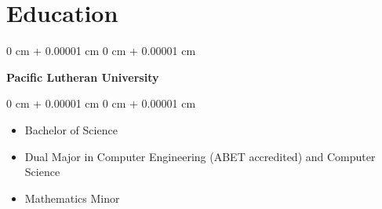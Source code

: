 \documentclass[10pt, letterpaper]{article}
\newenvironment{highlights}{
    \begin{itemize}[
        topsep=0.10 cm,
        parsep=0.10 cm,
        partopsep=0pt,
        itemsep=0pt,
        leftmargin=0 cm + 10pt
    ]
}{
    \end{itemize}
} %
\newenvironment{onecolentry}{
    \begin{adjustwidth}{
        0 cm + 0.00001 cm
    }{
        0 cm + 0.00001 cm
    }
}{
    \end{adjustwidth}
} %
\newenvironment{twocolentry}[2][]{
    \onecolentry
    \def\secondColumn{#2}
    \setcolumnwidth{\fill, 4.5 cm}
    \begin{paracol}{2}
}{
    \switchcolumn \raggedleft \secondColumn
    \end{paracol}
    \endonecolentry
} %
\begin{document}
    
    \section{Education}

        \begin{twocolentry}{
            
        }
            \textbf{Pacific Lutheran University}
        \end{twocolentry}

        \vspace{0.10 cm}
        \begin{onecolentry}
            \begin{highlights}
                \item Bachelor of Science
                \item Dual Major in Computer Engineering (ABET accredited) and Computer Science
                \item Mathematics Minor
            \end{highlights}
        \end{onecolentry}
\end{document}

